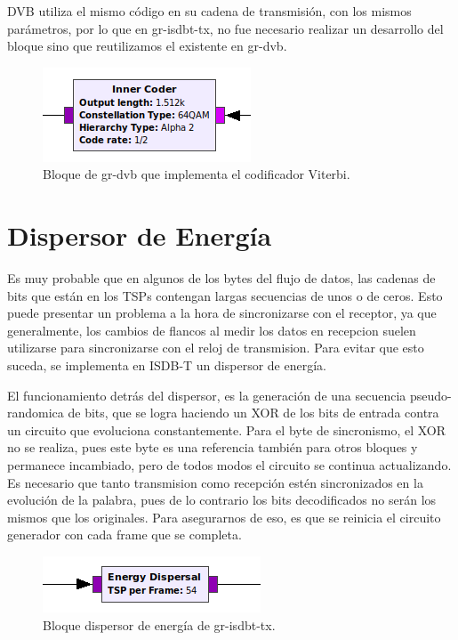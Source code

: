 	DVB utiliza el mismo código en su cadena de transmisión, con los mismos parámetros, por lo que en gr-isdbt-tx, no fue necesario realizar un desarrollo del bloque sino que reutilizamos el existente en gr-dvb. 
	
	\begin{figure}[h!]
		\centering
		\includegraphics[scale=0.5]{figuras/cap05/inner}
		\caption{\label{f:inner} Bloque de gr-dvb que implementa el codificador Viterbi.}
	\end{figure}

\section{Dispersor de Energía}

Es muy probable que en algunos de los bytes del flujo de datos, las cadenas de bits que están en los TSPs contengan largas secuencias de unos o de ceros. Esto puede presentar un problema a la hora de sincronizarse con el receptor, ya que generalmente, los cambios de flancos al medir los datos en recepcion suelen utilizarse para sincronizarse con el reloj de transmision. Para evitar que esto suceda, se implementa en ISDB-T un dispersor de energía. 

El funcionamiento detrás del dispersor, es la generación de una secuencia pseudo-randomica de bits, que se logra haciendo un XOR de los bits de entrada contra un circuito que evoluciona constantemente. Para el byte de sincronismo, el XOR no se realiza, pues este byte es una referencia también para otros bloques y permanece incambiado, pero de todos modos el circuito se continua actualizando. Es necesario que tanto transmision como recepción estén sincronizados en la evolución de la palabra, pues de lo contrario los bits decodificados no serán los mismos que los originales. Para asegurarnos de eso, es que se reinicia el circuito generador con cada frame que se completa.

\begin{figure}[h!]
	\centering
	\includegraphics[scale=0.5]{figuras/cap05/energy}
	\caption{\label{f:energy} Bloque dispersor de energía de gr-isdbt-tx.}
\end{figure}

